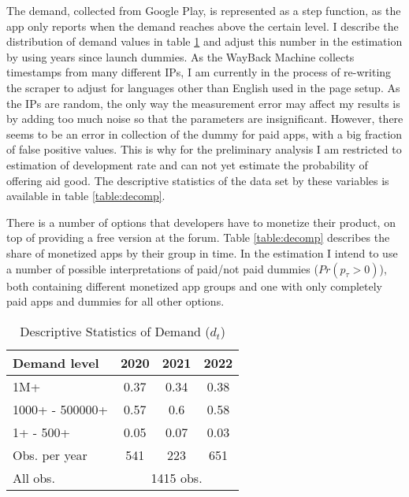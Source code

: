 \documentclass[13pt]{article}
\numberwithin{figure}{section}
\numberwithin{table}{section}
\theoremstyle{indented}
\numberwithin{equation}{section} %
\begin{document}
The demand, collected from Google Play, is represented as a step function, as the app only reports when the demand reaches above the certain level. I describe the distribution of demand values in table \ref{table:demand} and adjust this number in the estimation by using years since launch dummies. As the WayBack Machine collects timestamps from many different IPs, I am currently in the process of re-writing the scraper to adjust for languages other than English used in the page setup. As the IPs are random, the only way the measurement error may affect my results is by adding too much noise so that the parameters are insignificant. However, there seems to be an error in  collection of the dummy for paid apps, with a big fraction of false positive values. This is why for the preliminary analysis I am restricted to estimation of development rate and can not yet estimate the probability of offering aid good. The descriptive statistics of the data set by these variables is available in table \ref{table:decomp}.


 There is a number of options that developers have to monetize their product, on top of providing a free version at the forum. Table \ref{table:decomp} describes the share of monetized apps by their group in time. In the estimation I intend to use a number of possible interpretations of paid/not paid dummies ($Pr(p_{\tau}>0)$), both containing different monetized app groups and one with only completely paid apps and dummies for all other options.
 
    \begin{table}
    \centering
       \caption{Descriptive Statistics of Demand ($d_t$)} 
  \label{table:demand} 
  \begin{tabular}{|l|c|c|c|}
        \hline 
    Demand level & 2020 & 2021 & 2022 \\ 
       \hline
    1M+ & 0.37 & 0.34& 0.38\\
    
    1000+ - 500000+& 0.57 & 0.6 & 0.58\\ 
    
    1+ - 500+ & 0.05& 0.07 & 0.03\\ 
    \hline
   
    Obs. per year   &   541 & 223 & 651 \\
        \hline 
    All obs.& \multicolumn{3}{c|}{1415 obs.} \\
    \hline
    \end{tabular} 
    \end{table} 
\end{document}
